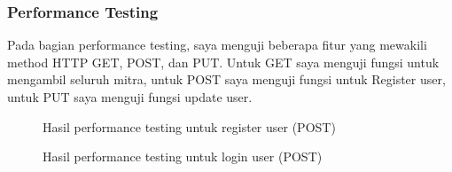 \subsubsection{Performance Testing}
Pada bagian performance testing, saya menguji beberapa fitur yang mewakili method HTTP GET, POST, dan PUT. Untuk GET saya menguji fungsi untuk mengambil seluruh mitra, untuk POST saya menguji fungsi untuk Register user, untuk PUT saya menguji fungsi update user.

\begin{figure}[H]
	{\par}
	\caption{Hasil performance testing untuk register user (POST)}
	\label{register-testing}
\end{figure}

\begin{figure}[H]
	{\par}
	\caption{Hasil performance testing untuk login user (POST)}
	\label{login-testing}
\end{figure}

